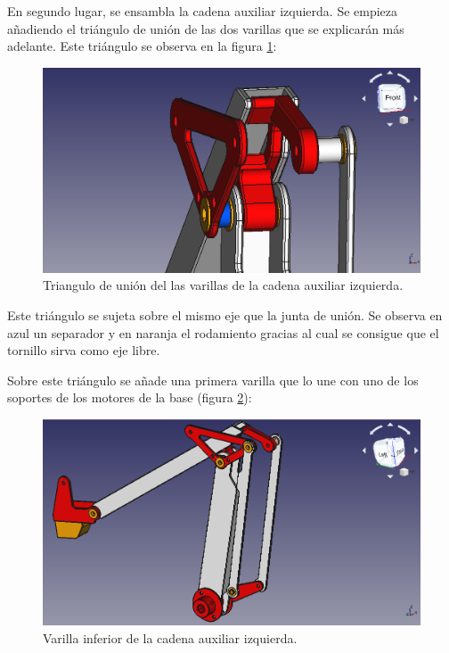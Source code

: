 En segundo lugar, se ensambla la cadena auxiliar izquierda. Se empieza añadiendo el triángulo de unión de las dos varillas que se explicarán más adelante. Este triángulo se observa en la figura \ref{fig:triangulo_union_varillas}:

\begin{figure}[H]
    \centering 
    \includegraphics[width=1\linewidth]{pictures/TrianguloDeUnion.png}
    \caption{Triangulo de unión del las varillas de la cadena auxiliar izquierda.}
    \label{fig:triangulo_union_varillas}
\end{figure}

Este triángulo se sujeta sobre el mismo eje que la junta de unión.
Se observa en azul un separador y en naranja el rodamiento gracias al cual se consigue que el tornillo sirva como eje libre.

Sobre este triángulo se añade una primera varilla que lo une con uno de los soportes de los motores de la base (figura \ref{fig:varilla_inferior_izquierda}):

\begin{figure}[H]
    \centering 
    \includegraphics[width=1\linewidth]{pictures/VarillaInferior.png}
    \caption{Varilla inferior de la cadena auxiliar izquierda.}
    \label{fig:varilla_inferior_izquierda}
\end{figure}

